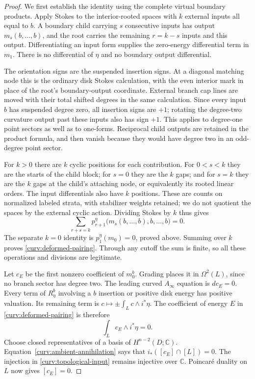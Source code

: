 \documentclass[11pt]{article}
\numberwithin{equation}{section}
\theoremstyle{definition}
\theoremstyle{remark}
\newcommand{\C}{\mathbb C}
\begin{document}
\begin{proof}
We first establish the identity using the complete virtual boundary
products.  Apply Stokes to the interior-rooted spaces with $k$
external inputs all equal to $b$.  A boundary child carrying $s$
consecutive inputs has output $m_s(b,\ldots,b)$, and the root carries
the remaining $r=k-s$ inputs and this output.  Differentiating an
input form supplies the zero-energy differential term in $m_1$.
There is no differential of $\eta$ and no boundary output
differential.

The orientation signs are the suspended insertion signs.  At a
diagonal matching node this is the ordinary disk Stokes calculation,
with the even interior mark in place of the root's boundary-output
coordinate.  External branch cap lines are moved with their total
shifted degrees in the same calculation.  Since every input $b$
has suspended degree zero, all insertion signs are $+1$; rotating
the degree-two curvature output past these inputs also has sign
$+1$.  This applies to degree-one point sectors as well as to
one-forms.  Reciprocal child outputs are retained in the product
formula, and then vanish because they would have degree two in an
odd-degree point sector.

For $k>0$ there are $k$ cyclic positions for each contribution.
For $0<s<k$ they are the starts of the child block; for $s=0$ they
are the $k$ gaps; and for $s=k$ they are the $k$ gaps at the child's
attaching node, or equivalently its rooted linear orders.  The
input differentials also have $k$ positions.  These are counts on
normalized labeled strata, with stabilizer weights retained; we
do not quotient the spaces by the external cyclic action.
Dividing Stokes by $k$ thus gives
\[
 \sum_{r+s=k}
 p_{r+1}^\eta\bigl(m_s(b,\ldots,b),b,\ldots,b\bigr)=0.
\]
The separate $k=0$ identity is $p_1^\eta(m_0)=0$, proved above.
Summing over $k$ proves \eqref{curv:deformed-pairing}.  Through any
cutoff the sum is finite, so all these operations and divisions are
legitimate.

Let $c_E$ be the first nonzero coefficient of $m_0^b$.  Grading
places it in $\Omega^2(L)$, since no branch sector has degree two.
The leading curved $A_\infty$ equation is $dc_E=0$.  Every term
of $R_\eta^b$ involving a $b$ insertion or positive disk energy has
positive valuation.  Its remaining term is
$c\mapsto\pm\int_L c\wedge i^*\eta$.  The coefficient of energy
$E$ in \eqref{curv:deformed-pairing} is therefore
\begin{equation}\label{curv:ambient-annihilation}
 \int_L c_E\wedge i^*\eta=0.
\end{equation}
Choose closed representatives of a basis of $H^{n-2}(D;\C)$.
Equation~\eqref{curv:ambient-annihilation} says that
$i_*([c_E]\cap[L])=0$.  The injection in
\eqref{curv:topological-input} remains injective over $\C$.
Poincar\'e duality on $L$ now gives $[c_E]=0$.
\end{proof}
\end{document}

